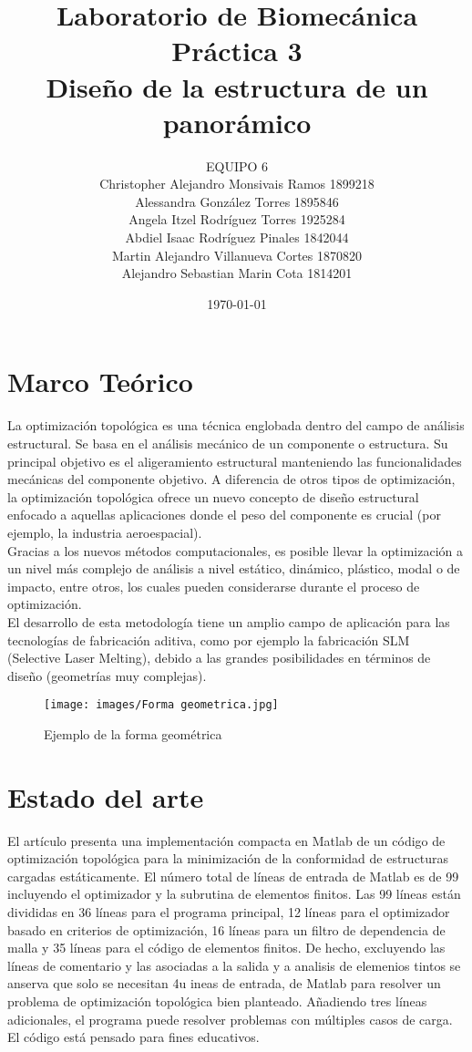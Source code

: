 \documentclass{article}
\author{EQUIPO 6\\Christopher Alejandro Monsivais Ramos   1899218\\
Alessandra González Torres  1895846\\
Angela Itzel Rodríguez Torres   1925284\\
Abdiel Isaac Rodríguez Pinales  1842044\\
Martin Alejandro Villanueva Cortes  1870820\\
Alejandro Sebastian Marin Cota  1814201} %
\title{Laboratorio de Biomecánica\\Pr\'{a}ctica 3\\Diseño de la estructura de un panor\'{a}mico} %
\date{\today}
\begin{document}

\maketitle %



\section{Marco Te\'{o}rico}\label{intro} %
La optimización topológica es una técnica englobada dentro del campo de análisis estructural. Se basa en el análisis mecánico de un componente o estructura. Su principal objetivo es el aligeramiento estructural manteniendo las funcionalidades mecánicas del componente objetivo. A diferencia de otros tipos de optimización, la optimización topológica ofrece un nuevo concepto de diseño estructural enfocado a aquellas aplicaciones donde el peso del componente es crucial (por ejemplo, la industria aeroespacial).
\\
Gracias a los nuevos métodos computacionales, es posible llevar la optimización a un nivel más complejo de análisis a nivel estático, dinámico, plástico, modal o de impacto, entre otros, los cuales pueden considerarse durante el proceso de optimización.
\\
El desarrollo de esta metodología tiene un amplio campo de aplicación para las tecnologías de fabricación aditiva, como por ejemplo la fabricación SLM (Selective Laser Melting), debido a las grandes posibilidades en términos de diseño (geometrías muy complejas).\cite{ff2}
 
\begin{figure}[h] %
    \centering
    \texttt{[image: images/Forma geometrica.jpg]} %
    \caption{Ejemplo de la forma geom\'{e}trica}
\end{figure}

\newpage

\section{Estado del arte}
El artículo presenta una implementación compacta en Matlab de un código de optimización topológica para la minimización de la conformidad de estructuras cargadas estáticamente. El número total de líneas de entrada de Matlab es de 99 incluyendo el optimizador y la subrutina de elementos finitos. Las 99 líneas están divididas en 36 líneas para el programa principal, 12 líneas para el optimizador basado en criterios de optimización, 16 líneas para un filtro de dependencia de malla y 35 líneas para el código de elementos finitos. De hecho, excluyendo las líneas de comentario y las asociadas a la salida y a analisis de elemenios tintos se anserva que solo se necesitan 4u ineas de entrada, de Matlab para resolver un problema de optimización topológica bien planteado. Añadiendo tres líneas adicionales, el programa puede resolver problemas con múltiples casos de carga. El código está pensado para fines educativos.
\\
\end{document}
